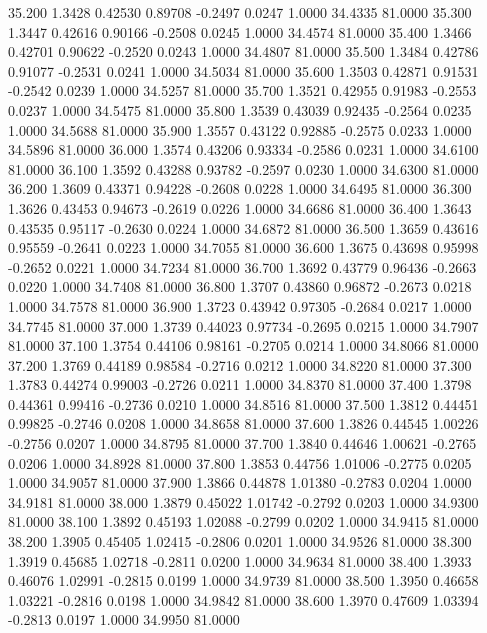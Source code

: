  35.200   1.3428   0.42530   0.89708  -0.2497   0.0247   1.0000  34.4335  81.0000
  35.300   1.3447   0.42616   0.90166  -0.2508   0.0245   1.0000  34.4574  81.0000
  35.400   1.3466   0.42701   0.90622  -0.2520   0.0243   1.0000  34.4807  81.0000
  35.500   1.3484   0.42786   0.91077  -0.2531   0.0241   1.0000  34.5034  81.0000
  35.600   1.3503   0.42871   0.91531  -0.2542   0.0239   1.0000  34.5257  81.0000
  35.700   1.3521   0.42955   0.91983  -0.2553   0.0237   1.0000  34.5475  81.0000
  35.800   1.3539   0.43039   0.92435  -0.2564   0.0235   1.0000  34.5688  81.0000
  35.900   1.3557   0.43122   0.92885  -0.2575   0.0233   1.0000  34.5896  81.0000
  36.000   1.3574   0.43206   0.93334  -0.2586   0.0231   1.0000  34.6100  81.0000
  36.100   1.3592   0.43288   0.93782  -0.2597   0.0230   1.0000  34.6300  81.0000
  36.200   1.3609   0.43371   0.94228  -0.2608   0.0228   1.0000  34.6495  81.0000
  36.300   1.3626   0.43453   0.94673  -0.2619   0.0226   1.0000  34.6686  81.0000
  36.400   1.3643   0.43535   0.95117  -0.2630   0.0224   1.0000  34.6872  81.0000
  36.500   1.3659   0.43616   0.95559  -0.2641   0.0223   1.0000  34.7055  81.0000
  36.600   1.3675   0.43698   0.95998  -0.2652   0.0221   1.0000  34.7234  81.0000
  36.700   1.3692   0.43779   0.96436  -0.2663   0.0220   1.0000  34.7408  81.0000
  36.800   1.3707   0.43860   0.96872  -0.2673   0.0218   1.0000  34.7578  81.0000
  36.900   1.3723   0.43942   0.97305  -0.2684   0.0217   1.0000  34.7745  81.0000
  37.000   1.3739   0.44023   0.97734  -0.2695   0.0215   1.0000  34.7907  81.0000
  37.100   1.3754   0.44106   0.98161  -0.2705   0.0214   1.0000  34.8066  81.0000
  37.200   1.3769   0.44189   0.98584  -0.2716   0.0212   1.0000  34.8220  81.0000
  37.300   1.3783   0.44274   0.99003  -0.2726   0.0211   1.0000  34.8370  81.0000
  37.400   1.3798   0.44361   0.99416  -0.2736   0.0210   1.0000  34.8516  81.0000
  37.500   1.3812   0.44451   0.99825  -0.2746   0.0208   1.0000  34.8658  81.0000
  37.600   1.3826   0.44545   1.00226  -0.2756   0.0207   1.0000  34.8795  81.0000
  37.700   1.3840   0.44646   1.00621  -0.2765   0.0206   1.0000  34.8928  81.0000
  37.800   1.3853   0.44756   1.01006  -0.2775   0.0205   1.0000  34.9057  81.0000
  37.900   1.3866   0.44878   1.01380  -0.2783   0.0204   1.0000  34.9181  81.0000
  38.000   1.3879   0.45022   1.01742  -0.2792   0.0203   1.0000  34.9300  81.0000
  38.100   1.3892   0.45193   1.02088  -0.2799   0.0202   1.0000  34.9415  81.0000
  38.200   1.3905   0.45405   1.02415  -0.2806   0.0201   1.0000  34.9526  81.0000
  38.300   1.3919   0.45685   1.02718  -0.2811   0.0200   1.0000  34.9634  81.0000
  38.400   1.3933   0.46076   1.02991  -0.2815   0.0199   1.0000  34.9739  81.0000
  38.500   1.3950   0.46658   1.03221  -0.2816   0.0198   1.0000  34.9842  81.0000
  38.600   1.3970   0.47609   1.03394  -0.2813   0.0197   1.0000  34.9950  81.0000

